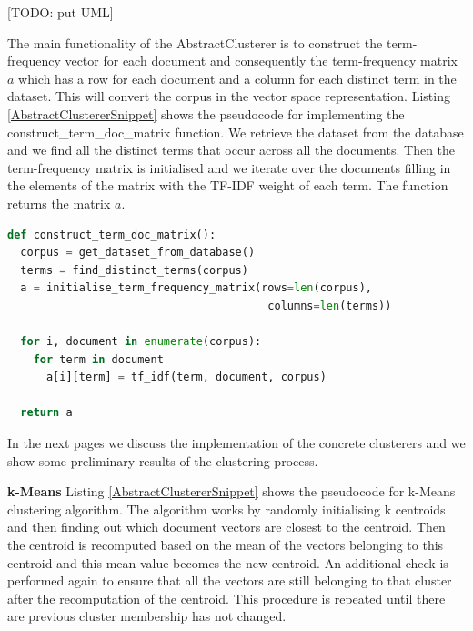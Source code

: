 [TODO: put UML]     

The main functionality of the AbstractClusterer is to construct the term-frequency vector for each document and consequently the term-frequency matrix $a$ which has a row for each document and a column for each distinct term in the dataset. This will convert the corpus in the vector space representation. Listing \ref{AbstractClustererSnippet} shows the pseudocode for implementing the construct\_term\_doc\_matrix function. We retrieve the dataset from the database and we find all the distinct terms that occur across all the documents. Then the term-frequency matrix is initialised and we iterate over the documents filling in the elements of the matrix with the TF-IDF weight of each term. The function returns the matrix $a$.

\begin{lstlisting}[language=Python, label=AbstractClustererSnippet, caption=Pseudocode for constructing the term-frequency matrix for a dataset]
def construct_term_doc_matrix():
  corpus = get_dataset_from_database()
  terms = find_distinct_terms(corpus)
  a = initialise_term_frequency_matrix(rows=len(corpus), 
                                        columns=len(terms))
  
  for i, document in enumerate(corpus):
    for term in document
      a[i][term] = tf_idf(term, document, corpus)
    
  return a 
\end{lstlisting}

In the next pages we discuss the implementation of the concrete clusterers and we show some preliminary results of the clustering process.

\textbf{k-Means}
Listing \ref{AbstractClustererSnippet} shows the pseudocode for k-Means clustering algorithm. The algorithm works by randomly initialising k centroids and then finding out which document vectors are closest to the centroid. Then the centroid is recomputed based on the mean of the vectors belonging to this centroid and this mean value becomes the new centroid. An additional check is performed again to ensure that all the vectors are still belonging to that cluster after the recomputation of the centroid. This procedure is repeated until there are previous cluster membership has not changed. 

